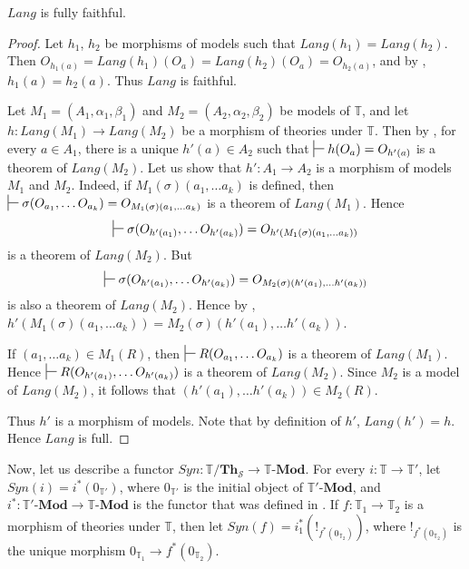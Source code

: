 \documentclass[reqno]{amsart}
\theoremstyle{definition}
\theoremstyle{remark}
\newcommand{\cat}[1]{\mathbf{#1}}
\newcommand{\Mod}[1]{#1\text{-}\cat{Mod}}
\newcommand{\Th}{\cat{Th}}
\numberwithin{figure}{section}
\begin{document}
\begin{prop}
$Lang$ is fully faithful.
\end{prop}
\begin{proof}
Let $h_1$, $h_2$ be morphisms of models such that $Lang(h_1) = Lang(h_2)$.
Then $O_{h_1(a)} = Lang(h_1)(O_a) = Lang(h_2)(O_a) = O_{h_2(a)}$, and by , $h_1(a) = h_2(a)$.
Thus $Lang$ is faithful.

Let $M_1 = (A_1,\alpha_1,\beta_1)$ and $M_2 = (A_2,\alpha_2,\beta_2)$ be models of $\mathbb{T}$,
    and let $h : Lang(M_1) \to Lang(M_2)$ be a morphism of theories under $\mathbb{T}$.
Then by , for every $a \in A_1$, there is a unique $h'(a) \in A_2$ such that $\sststile{}{} h(O_a) = O_{h'(a)}$ is a theorem of $Lang(M_2)$.
Let us show that $h' : A_1 \to A_2$ is a morphism of models $M_1$ and $M_2$.
Indeed, if $M_1(\sigma)(a_1, \ldots a_k)$ is defined, then $\sststile{}{} \sigma(O_{a_1}, \ldots O_{a_k}) = O_{M_1(\sigma)(a_1, \ldots a_k)}$ is a theorem of $Lang(M_1)$.
Hence \[ \sststile{}{} \sigma(O_{h'(a_1)}, \ldots O_{h'(a_k)}) = O_{h'(M_1(\sigma)(a_1, \ldots a_k))} \] is a theorem of $Lang(M_2)$.
But \[ \sststile{}{} \sigma(O_{h'(a_1)}, \ldots O_{h'(a_k)}) = O_{M_2(\sigma)(h'(a_1), \ldots h'(a_k))} \] is also a theorem of $Lang(M_2)$.
Hence by , $h'(M_1(\sigma)(a_1, \ldots a_k)) = M_2(\sigma)(h'(a_1), \ldots h'(a_k))$.

If $(a_1, \ldots a_k) \in M_1(R)$, then $\sststile{}{} R(O_{a_1}, \ldots O_{a_k})$ is a theorem of $Lang(M_1)$.
Hence $\sststile{}{} R(O_{h'(a_1)}, \ldots O_{h'(a_k)})$ is a theorem of $Lang(M_2)$.
Since $M_2$ is a model of $Lang(M_2)$, it follows that $(h'(a_1), \ldots h'(a_k)) \in M_2(R)$.

Thus $h'$ is a morphism of models.
Note that by definition of $h'$, $Lang(h') = h$.
Hence $Lang$ is full.
\end{proof}

Now, let us describe a functor $Syn : \mathbb{T}/\Th_\mathcal{S} \to \Mod{\mathbb{T}}$.
For every $i : \mathbb{T} \to \mathbb{T}'$, let $Syn(i) = i^*(0_{\mathbb{T}'})$, where $0_{\mathbb{T}'}$ is the initial object of $\Mod{\mathbb{T}'}$,
    and $i^* : \Mod{\mathbb{T}'} \to \Mod{\mathbb{T}}$ is the functor that was defined in \cite{alg-tt}.
If $f : \mathbb{T}_1 \to \mathbb{T}_2$ is a morphism of theories under $\mathbb{T}$, then let $Syn(f) = i_1^*(!_{f^*(0_{\mathbb{T}_2})})$,
    where $!_{f^*(0_{\mathbb{T}_2})}$ is the unique morphism $0_{\mathbb{T}_1} \to f^*(0_{\mathbb{T}_2})$.
\end{document}
